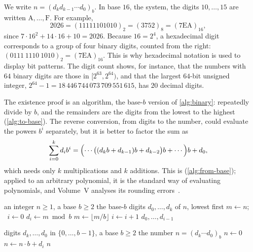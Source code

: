 We write $n=(d_kd_{k-1}\cdots d_0)_b$. In base $16$, the  system, the digits $10,\ldots,15$ are written $\mathrm A,\ldots,\mathrm F$. For example,
\[
2026=(11111101010)_2=(3752)_8=(\mathrm{7EA})_{16},
\]
since $7\cdot16^2+14\cdot16+10=2026$. Because $16=2^4$, a hexadecimal digit corresponds to a group of four binary digits, counted from the right: $(0111\ 1110\ 1010)_2=(\mathrm{7EA})_{16}$. This is why hexadecimal notation is used to display bit patterns. The digit count shows, for instance, that the numbers with $64$ binary digits are those in $[2^{63},2^{64})$, and that the largest $64$-bit unsigned integer, $2^{64}-1=18\,446\,744\,073\,709\,551\,615$, has $20$ decimal digits.

The existence proof is an algorithm, the base-$b$ version of \cref{alg:binary}: repeatedly divide by $b$, and the remainders are the digits from the lowest to the highest (\cref{alg:to-base}). The reverse conversion, from digits to the number, could evaluate the powers $b^i$ separately, but it is better to factor the sum as
\[
\sum_{i=0}^kd_ib^i=\Bigl(\cdots\bigl((d_kb+d_{k-1})b+d_{k-2}\bigr)b+\cdots\Bigr)b+d_0 ,
\]
which needs only $k$ multiplications and $k$ additions. This is  (\cref{alg:from-base}); applied to an arbitrary polynomial, it is the standard way of evaluating polynomials, and Volume~V analyses its rounding errors~\cite[Sect.~4.6.4]{knuth1997taocp2}.

\begin{algorithm}
\begin{algorithmic}[1]
\Require an integer $n\ge1$, a base $b\ge2$
\Ensure the base-$b$ digits $d_0,\ldots,d_k$ of $n$, lowest first
\State $m\gets n$; \ $i\gets0$
 
  \State $d_i\gets m\bmod b$
  \State $m\gets\lfloor m/b\rfloor$
  \State $i\gets i+1$
\EndWhile
\State \Return $d_0,\ldots,d_{i-1}$
\end{algorithmic}
\caption{Conversion of an integer to base $b$ by repeated division.}
\label{alg:to-base}
\end{algorithm}

\begin{algorithm}
\begin{algorithmic}[1]
\Require digits $d_k,\ldots,d_0$ in $\{0,\ldots,b-1\}$, a base $b\ge2$
\Ensure the number $n=(d_k\cdots d_0)_b$
\State $n\gets0$
 
  \State $n\gets n\cdot b+d_i$
\EndFor
\State \Return $n$
\end{algorithmic}
\caption{Conversion of digits to a number by Horner's scheme.}
\label{alg:from-base}
\end{algorithm}

